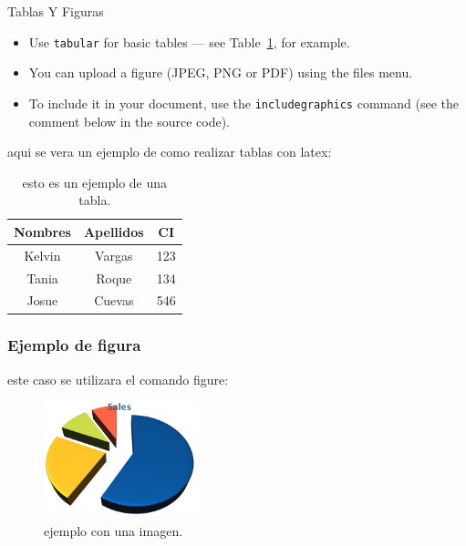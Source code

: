 \documentclass[10pt,xcolor={table,dvipsnames},t]{beamer}
\begin{document}
\begin{frame}{Tablas Y Figuras}

\begin{itemize}
\item Use \texttt{tabular} for basic tables --- see Table~\ref{tab:widgets}, for example.
\item You can upload a figure (JPEG, PNG or PDF) using the files menu. 
\item To include it in your document, use the \texttt{includegraphics} command (see the comment below in the source code).
\end{itemize}

\begin{table}
aqui se vera un ejemplo de como realizar tablas con latex: \\
\centering
\begin{tabular}{| c | c | c |}
\hline
Nombres & Apellidos & CI \\
\hline
Kelvin & Vargas & 123  \\
Tania & Roque & 134 \\
Josue & Cuevas & 546 \\
\hline
\end{tabular}
\caption{\label{tab:widgets}esto es un ejemplo de una tabla.}
\end{table}
\end{frame}

\begin{frame}
\frametitle{Ejemplo de figura}

este caso se utilizara el comando figure:

\begin{figure}
\includegraphics[width=0.4\textwidth]{chart}
\caption{\label{fig:your-figure}ejemplo con una imagen.}
\end{figure}
\end{frame}
\end{document}
